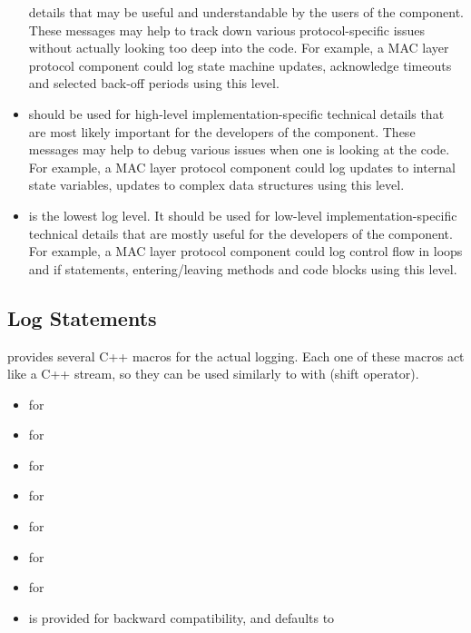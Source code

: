 \begin{itemize}
    details that may be useful and understandable by the users of the component.
    These messages may help to track down various protocol-specific issues
    without actually looking too deep into the code. For example, a MAC layer
    protocol component could log state machine updates, acknowledge timeouts
    and selected back-off periods using this level.
  \item {} should be used for high-level
    implementation-specific technical details that are most likely important
    for the developers of the component. These messages may help to debug
    various issues when one is looking at the code. For example, a MAC layer
    protocol component could log updates to internal state variables, updates
    to complex data structures using this level.
  \item {} is the lowest log level. It should be used for
    low-level implementation-specific technical details that are mostly useful
    for the developers of the component. For example, a MAC layer protocol
    component could log control flow in loops and if statements,
    entering/leaving methods and code blocks using this level.
\end{itemize}

\subsection{Log Statements}
\label{sec:sim-lib:log-statements}

{\opp} provides several C++ macros for the actual logging. Each one of these
macros act like a C++ stream, so they can be used similarly to 
with  (shift operator).

\begin{itemize}
  \item {} for 
  \item {} for 
  \item {} for 
  \item {} for 
  \item {} for 
  \item {} for 
  \item {} for 
  \item {} is provided for backward compatibility, and defaults to 
\end{itemize}

